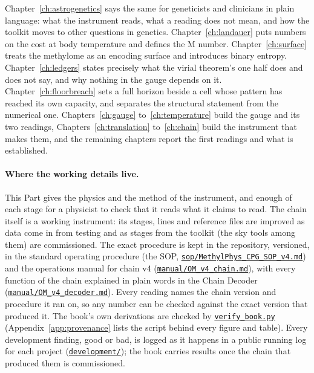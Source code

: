 Chapter~\ref{ch:astrogenetics} says the same for geneticists and clinicians in plain language: what the instrument reads, what a reading
does not mean, and how the toolkit moves to other questions in genetics.
Chapter~\ref{ch:landauer} puts numbers on the cost at body temperature and defines the M
number. Chapter~\ref{ch:surface} treats the methylome as an encoding surface and introduces binary
entropy. Chapter~\ref{ch:ledgers} states precisely what the virial theorem's one half does and does not say, and why
nothing in the gauge depends on it. Chapter~\ref{ch:floorbreach} sets a full horizon beside a cell whose pattern has
reached its own capacity, and separates the structural statement from the numerical one.
Chapters~\ref{ch:gauge} to~\ref{ch:temperature} build the gauge and its two readings, Chapters~\ref{ch:translation}
to~\ref{ch:chain} build the instrument that makes them, and the remaining chapters report the first readings and what is
established.

\paragraph{Where the working details live.} This Part gives the physics and the method of the instrument, and enough of each stage
for a physicist to check that it reads what it claims to read. The chain itself is a working instrument: its stages, lines and reference
files are improved as data come in from testing and as stages from the toolkit (the sky tools among them) are commissioned. The exact
procedure is kept in the repository, versioned, in the standard operating procedure (the SOP,
\href{https://github.com/hmahaffeyges/IAM-Validation/blob/main/Biological_Physics/MethylPhys/sop/MethylPhys_CPG_SOP_v4.md}{\texttt{sop/MethylPhys\_CPG\_SOP\_v4.md}}) and the operations
manual for chain v4 (\href{https://github.com/hmahaffeyges/IAM-Validation/blob/main/Biological_Physics/MethylPhys/manual/OM_v4_chain.md}{\texttt{manual/OM\_v4\_chain.md}}),
with every function of the chain explained in plain words in the Chain Decoder (\href{https://github.com/hmahaffeyges/IAM-Validation/blob/main/Biological_Physics/MethylPhys/manual/OM_v4_decoder.md}{\texttt{manual/OM\_v4\_decoder.md}}).
Every reading names the chain version and procedure it ran on, so any number can be checked against the exact version that produced it.
The book's own derivations are checked by \href{https://github.com/hmahaffeyges/IAM-Validation/blob/main/docs/book/verify_book.py}{\texttt{verify\_book.py}} (Appendix~\ref{app:provenance}
lists the script behind every figure and table). Every development finding, good or bad, is logged as it happens in a public running log for
each project (\href{https://github.com/hmahaffeyges/IAM-Validation/tree/main/development}{\texttt{development/}}); the book carries results once the
chain that produced them is commissioned.
